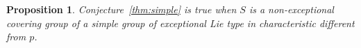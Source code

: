 \documentclass[12pt]{amsart}
\theoremstyle{plain}
\newtheorem{pro}[thm]{Proposition}
\theoremstyle{definition}
\numberwithin{equation}{section}
\newcommand{\Aut}{\operatorname{Aut}}
\newcommand{\Ker}{\operatorname{Ker}}
\newcommand{\bG}{\mathbf{G}}
\newcommand{\bL}{\mathbf{L}}
\newcommand{\bN}{\mathbf{N}}
\newcommand{\bS}{{\mathbf{S}}}
\begin{document}
%
%


\begin{pro}
\label{prop:cross-char} Conjecture~\ref{thm:simple} is true when $S$
is a non-exceptional covering group of a simple group of exceptional
Lie type in characteristic different from $p$.
\end{pro}
\end{document}
